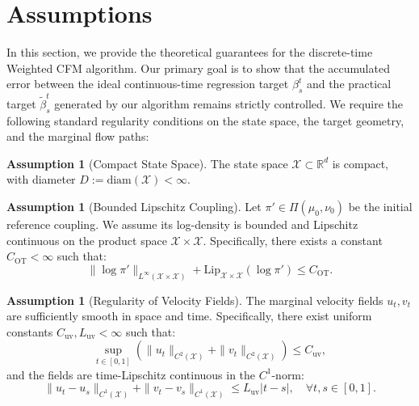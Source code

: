 \documentclass[11pt]{article}
\theoremstyle{definition}
\newtheorem{assumption}[theorem]{Assumption}
\numberwithin{equation}{section}%
\begin{document}
{\begin{figure}[omitted: a diagram of this paper's results, not reproduced here]\label{fig:proof_graph}\end{figure}

\section{Assumptions}
\label{app:assumptions}

In this section, we provide the theoretical guarantees for the discrete-time Weighted CFM algorithm. Our primary goal is to show that the accumulated error between the ideal continuous-time regression target $\beta_s^t$ and the practical target $\tilde{\beta}_s^t$ generated by our algorithm remains strictly controlled. We require the following standard regularity conditions on the state space, the target geometry, and the marginal flow paths:

\begin{assumption}[Compact State Space]
\label{ass:compact_X}
The state space $\mathcal X \subset \mathbb R^d$ is compact, with diameter $D := \mathrm{diam}(\mathcal X) < \infty$.
\end{assumption}

\begin{assumption}[Bounded Lipschitz Coupling]
\label{ass:coupling_regularity}
Let $\pi' \in \Pi(\mu_0, \nu_0)$ be the initial reference coupling. We assume its log-density is bounded and Lipschitz continuous on the product space $\mathcal{X} \times \mathcal{X}$. Specifically, there exists a constant $C_\mathrm{OT} < \infty$ such that:
\begin{equation}
\|\log \pi'\|_{L^\infty(\mathcal{X} \times \mathcal{X})} + \mathrm{Lip}_{\mathcal{X} \times \mathcal{X}}(\log \pi') \le C_\mathrm{OT}.
\end{equation}
\end{assumption}

\begin{assumption}[Regularity of Velocity Fields]
\label{ass:velocity_regularity}
The marginal velocity fields $u_t, v_t$ are sufficiently smooth in space and time. Specifically, there exist uniform constants $C_\mathrm{uv}, L_\mathrm{uv} < \infty$ such that:
\begin{equation}
\sup_{t \in [0,1]} \left( \|u_t\|_{C^2(\mathcal{X})} + \|v_t\|_{C^2(\mathcal{X})} \right) \le C_\mathrm{uv},
\end{equation}
and the fields are time-Lipschitz continuous in the $C^1$-norm:
\begin{equation}
\|u_t - u_s\|_{C^1(\mathcal{X})} + \|v_t - v_s\|_{C^1(\mathcal{X})} \le L_\mathrm{uv} |t - s|, \quad \forall t, s \in [0,1].
\end{equation}
\end{assumption}

}
\end{document}
